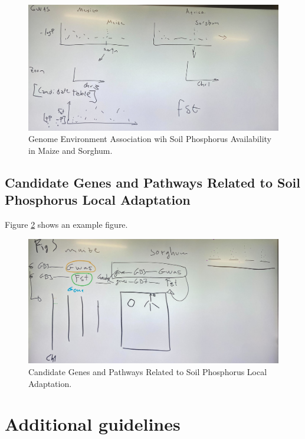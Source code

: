 \documentclass[9pt,twocolumn,twoside,lineno]{gsajnl}
\begin{document}
\begin{figure}[ht]
\centering
\includegraphics[width=0.8\paperwidth]{Figures/Fig2_Manhattan_plots.jpg}
\caption{Genome Environment Association wih Soil Phosphorus Availability in Maize and Sorghum.}
\label{fig:ManhattanPlots}
\end{figure}



\subsection{Candidate Genes and Pathways Related to Soil  Phosphorus Local Adaptation}

Figure \ref{fig:GenePathway} shows an example figure.

\begin{figure}[ht]
\centering
\includegraphics[width=0.8\paperwidth]{Figures/Fig3_Gene_Pathway.jpg}
\caption{Candidate Genes and Pathways Related to Soil  Phosphorus Local Adaptation.}
\label{fig:GenePathway}
\end{figure}


\section{Additional guidelines}
\end{document}
